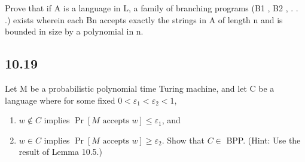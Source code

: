 Prove that if A is a language in L, a family of branching programs (B1 , B2 , . . .) exists wherein each Bn accepts exactly the strings in A of length n and is bounded in size by a polynomial in n.


\subsection*{10.19}

Let M be a probabilistic polynomial time Turing machine, and let C be a language where for some fixed $0 < \varepsilon_1 < \varepsilon_2 < 1$,

\begin{enumerate}[label=(\alph*), leftmargin=2.5em]

\item $w \notin C$ implies $\Pr[M \text{ accepts } w] \le \varepsilon_1$, and

\item $w \in C$ implies $\Pr[M \text{ accepts } w] \ge \varepsilon_2$. Show that $C \in$ BPP. (Hint: Use the result of Lemma 10.5.)

\end{enumerate}


\clearpage
